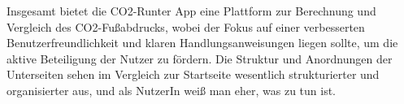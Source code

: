Insgesamt bietet die CO2-Runter App eine Plattform zur Berechnung und Vergleich des CO2-Fußabdrucks, wobei der Fokus auf einer verbesserten Benutzerfreundlichkeit und klaren Handlungsanweisungen liegen sollte, um die aktive Beteiligung der Nutzer zu fördern.
Die Struktur und Anordnungen der Unterseiten sehen im Vergleich zur Startseite wesentlich strukturierter und organisierter aus, und als NutzerIn weiß man eher, was zu tun ist.

